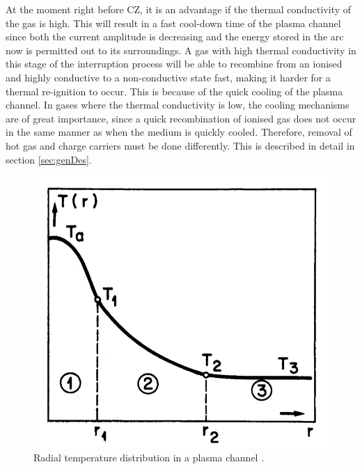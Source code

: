 \documentclass[10pt,a4paper,twoside]{article}
\begin{document}
At the moment right before CZ, it is an advantage if the thermal conductivity of the gas is high. This will result in a fast cool-down time of the plasma channel since both the current amplitude is decreasing and the energy stored in the arc now is permitted out to its surroundings. A gas with high thermal conductivity in this stage of the interruption process will be able to recombine from an ionised and highly conductive to a non-conductive state fast, making it harder for a thermal re-ignition to occur. This is because of the quick cooling of the plasma channel. In gases where the thermal conductivity is low, the cooling mechanisms are of great importance, since a quick recombination of ionised gas does not occur in the same manner as when the medium is quickly cooled. Therefore, removal of hot gas and charge carriers must be done differently. This is described in detail in section \ref{sec:genDes}.

\begin{figure}[H]
\centering
\includegraphics[scale=0.3]{Bilder/Theory/tempZonesArc.png}
\caption{Radial temperature distribution in a plasma channel \cite{bib:TDCIGBB}.} \label{fig:tempDist1}
\end{figure}
\end{document}
